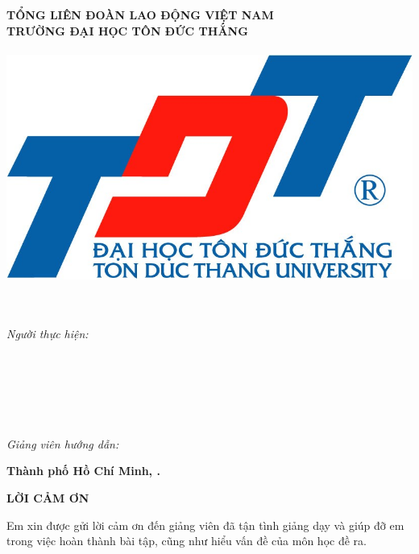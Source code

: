 \begin{center}
	\large{\textbf{TỔNG LIÊN ĐOÀN LAO ĐỘNG VIỆT NAM}} \\
	\large{\textbf{TRƯỜNG ĐẠI HỌC TÔN ĐỨC THẮNG}} \\
	\large{\textbf{\khoa}} \\\vspace*{1cm}	
	\includegraphics[width=0.5\linewidth]{lib/TDTlogo.jpg}\\\vspace*{1cm}	
	\uppercase{\Large{\textbf{\bai}}\\\vspace*{0.3cm}		
	\LARGE{\textbf{\de}}\\\vspace*{2cm}}
\begin{flushright}			
	\large{\textit{Người thực hiện:}} \\
		\large{\textbf{\tacgia}}\\
	\large{\textbf{\mstacgia}}\\
	\large{\textbf{\svhai}} \\
	\large{\textbf{\msvhai}}\\
	\large{\textbf{\svba}}\\
	\large{\textbf{\msvba}}\\

	\large{\textit{Giảng viên hướng dẫn:}} \\
	\large{\textbf{\gvhd}} 
	\vspace*{2cm}
\end{flushright}
	\large{\textbf{Thành phố Hồ Chí Minh, \nam.}}
\end{center}	
	\newpage
\begin{center}
	\Large{\textbf{LỜI CẢM ƠN}}
\end{center}
	Em xin được gửi lời cảm ơn đến giảng viên \gvhd đã tận tình giảng dạy và giúp đỡ em trong việc hoàn thành bài tập, cũng như hiểu vấn đề của môn học đề ra.\\
	
